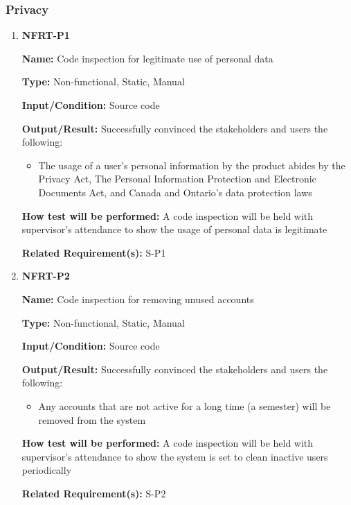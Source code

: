 \documentclass[12pt, titlepage]{article}
\begin{document}
\subsubsection{Privacy}
\begin{enumerate}
\item{\textbf{NFRT-P1}}

\textbf{Name:} Code inspection for legitimate use of personal data

\textbf{Type:} Non-functional, Static, Manual

\textbf{Input/Condition:} Source code

\textbf{Output/Result:} Successfully convinced the stakeholders and users the following:
\begin{itemize}
\item The usage of a user's personal information by the product abides by the Privacy Act, The Personal Information Protection and Electronic Documents Act, and Canada and Ontario's data protection laws
\end{itemize}

\textbf{How test will be performed:} A code inspection will be held with supervisor's attendance to show the usage of personal data is legitimate

\textbf{Related Requirement(s):} S-P1

\item{\textbf{NFRT-P2}}

\textbf{Name:} Code inspection for removing unused accounts

\textbf{Type:} Non-functional, Static, Manual

\textbf{Input/Condition:} Source code

\textbf{Output/Result:} Successfully convinced the stakeholders and users the following:
\begin{itemize}
\item Any accounts that are not active for a long time (a semester) will be removed from the system
\end{itemize}

\textbf{How test will be performed:} A code inspection will be held with supervisor's attendance to show the system is set to clean inactive users periodically

\textbf{Related Requirement(s):} S-P2
\end{enumerate}
\end{document}

